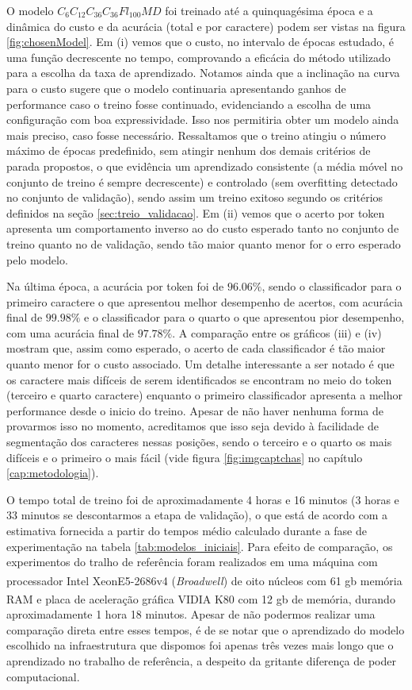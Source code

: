 O modelo $C_6C_{12}C_{36}C_{36}Fl_{100}MD$ foi treinado até a quinquagésima época e a dinâmica do custo e da acurácia (total e por caractere) podem ser vistas na figura \ref{fig:chosenModel}. Em (i) vemos que o custo, no intervalo de épocas estudado, é uma função decrescente no tempo, comprovando a eficácia do método utilizado para a escolha da taxa de aprendizado. Notamos ainda que a inclinação na curva para o custo sugere que o modelo continuaria apresentando ganhos de performance caso o treino fosse continuado, evidenciando a escolha de uma configuração com boa expressividade. Isso nos permitiria obter um modelo ainda mais preciso, caso fosse necessário. Ressaltamos que o treino atingiu o número máximo de épocas predefinido, sem atingir nenhum dos demais critérios de parada propostos, o que evidência um aprendizado consistente (a média móvel no conjunto de treino é sempre decrescente) e controlado (sem overfitting detectado no conjunto de validação), sendo assim um treino exitoso segundo os critérios definidos na seção \ref{sec:treio_validacao}. Em (ii) vemos que o acerto por token apresenta um comportamento inverso ao do custo esperado tanto no conjunto de treino quanto no de validação, sendo tão maior quanto menor for o erro esperado pelo modelo. 

Na última época, a acurácia por token foi de $96.06\%$, sendo o classificador para o primeiro caractere o que apresentou melhor  desempenho de acertos, com acurácia final de $99.98\%$ e o classificador para o quarto o que apresentou pior desempenho, com uma acurácia final de $97.78\%$. A comparação entre os gráficos (iii) e (iv) mostram que, assim como esperado, o acerto de cada classificador é tão maior quanto menor for o custo associado. Um detalhe interessante a ser notado é que os caractere mais difíceis de serem identificados se encontram no meio do token (terceiro e quarto caractere) enquanto o primeiro classificador apresenta a melhor performance desde o inicio do treino. Apesar de não haver nenhuma forma de provarmos isso no momento, acreditamos que isso seja devido à facilidade de segmentação dos caracteres nessas posições, sendo o terceiro e o quarto os mais difíceis e o primeiro o mais fácil (vide figura \ref{fig:imgcaptchas} no capítulo \ref{cap:metodologia}).

O tempo total de treino foi de aproximadamente 4 horas e 16 minutos (3 horas e 33 minutos se descontarmos a etapa de validação), o que está de acordo com a estimativa fornecida a partir do tempos médio calculado durante a fase de experimentação na tabela \ref{tab:modelos_iniciais}. Para efeito de comparação, os experimentos do tralho de referência foram realizados em uma máquina com processador Intel\textsuperscript{\textregistered} Xeon\texttrademark E5-2686v4 (\textit{Broadwell}) de oito núcleos com 61 gb memória RAM e placa de aceleração gráfica VIDIA\textsuperscript{\textregistered} K80 com 12 gb de memória, durando aproximadamente 1 hora 18 minutos. Apesar de não podermos realizar uma comparação direta entre esses tempos, é de se notar que o aprendizado do modelo escolhido na infraestrutura que dispomos foi apenas três vezes mais longo que o aprendizado no trabalho de referência, a despeito da gritante diferença de poder computacional. 

